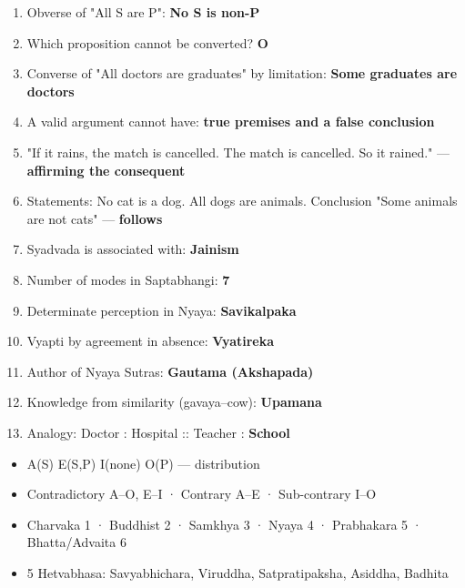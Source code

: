 \begin{enumerate}
\def\labelenumi{\arabic{enumi}.}
\setcounter{enumi}{27}
\tightlist
\item
  Obverse of "All S are P": \textbf{No S is non-P}
\item
  Which proposition cannot be converted? \textbf{O}
\item
  Converse of "All doctors are graduates" by limitation: \textbf{Some graduates are doctors}
\item
  A valid argument cannot have: \textbf{true premises and a false conclusion}
\item
  "If it rains, the match is cancelled. The match is cancelled. So it rained." --- \textbf{affirming the consequent}
\item
  Statements: No cat is a dog. All dogs are animals. Conclusion "Some animals are not cats" --- \textbf{follows}
\item
  Syadvada is associated with: \textbf{Jainism}
\item
  Number of modes in Saptabhangi: \textbf{7}
\item
  Determinate perception in Nyaya: \textbf{Savikalpaka}
\item
  Vyapti by agreement in absence: \textbf{Vyatireka}
\item
  Author of Nyaya Sutras: \textbf{Gautama (Akshapada)}
\item
  Knowledge from similarity (gavaya--cow): \textbf{Upamana}
\item
  Analogy: Doctor : Hospital :: Teacher : \textbf{School}
\end{enumerate}

\begin{revbox}

\begin{itemize}
\tightlist
\item
  A(S) E(S,P) I(none) O(P) --- distribution
\item
  Contradictory A--O, E--I · Contrary A--E · Sub-contrary I--O
\item
  Charvaka 1 · Buddhist 2 · Samkhya 3 · Nyaya 4 · Prabhakara 5 · Bhatta/Advaita 6
\item
  5 Hetvabhasa: Savyabhichara, Viruddha, Satpratipaksha, Asiddha, Badhita
\end{itemize}

\end{revbox}
